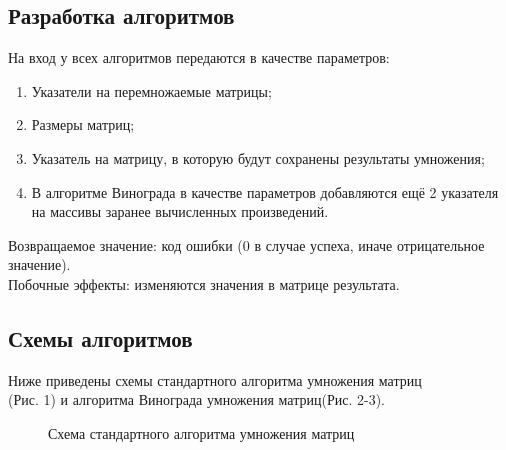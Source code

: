 \documentclass[a4paper,12pt]{article}
\begin{document}
\subsection{Разработка алгоритмов}
На вход у всех алгоритмов передаются в качестве параметров:
\begin{enumerate}
\item Указатели на перемножаемые матрицы;
\item Размеры матриц;
\item Указатель на матрицу, в которую будут сохранены результаты умножения;
\item В алгоритме Винограда в качестве параметров добавляются ещё 2 указателя на массивы заранее вычисленных произведений.
\end{enumerate}
Возвращаемое значение: код ошибки (0 в случае успеха, иначе отрицательное значение). \\
Побочные эффекты: изменяются значения в матрице результата.

\newpage
\subsection{Схемы алгоритмов}
Ниже приведены схемы стандартного алгоритма умножения матриц\\(Рис. 1) и алгоритма Винограда умножения матриц(Рис. 2-3).
\begin{figure}[h!]
\caption{Схема стандартного алгоритма умножения матриц}
\label{images:multiply_standard}
\end{figure}
\end{document}
